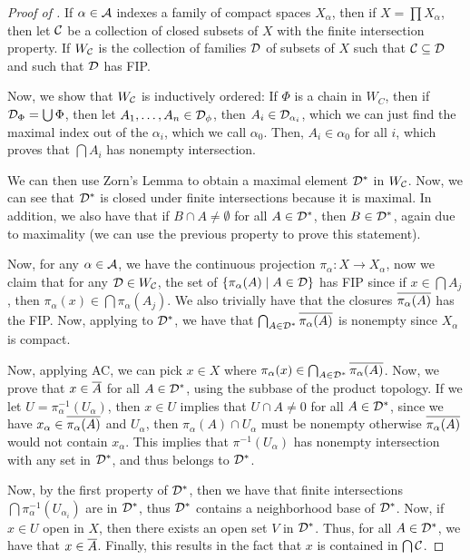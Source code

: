 \begin{proof}[Proof of ]
    If $\alpha \in \mathcal A$ indexes a family of compact spaces $X_\alpha$, then if $X = \prod X_\alpha$, then let $\mathcal C$ be a collection of closed subsets of $X$ with the finite intersection property. If $W_{\mathcal C}$ is the collection of families $\mathcal D$ of subsets of $X$ such that $\mathcal C \subseteq \mathcal D$ and such that $\mathcal D$ has FIP.

    Now, we show that $W_{\mathcal C}$ is inductively ordered: If $\Phi$ is a chain in $W_C$, then if $ \mathcal D_\Phi = \bigcup \Phi$, then let $A_1, \dots, A_n \in \mathcal D_\phi$, then $A_i \in \mathcal D_{\alpha_i}$, which we can just find the maximal index out of the $\alpha_i$, which we call $\alpha_0$. Then, $A_i \in \alpha_0$ for all $i$, which proves that $\bigcap A_i$ has nonempty intersection.

    We can then use Zorn's Lemma to obtain a maximal element $\mathcal D^*$ in $W_{\mathcal C}$. Now, we can see that $\mathcal D^*$ is closed under finite intersections because it is maximal. In addition, we also have that if $B \cap A \ne \emptyset$ for all $A \in \mathcal D^*$, then $B \in \mathcal D^*$, again due to maximality (we can use the previous property to prove this statement).

    Now, for any $\alpha \in \mathcal A$, we have the continuous projection $\pi_\alpha\colon X \to X_\alpha$, now we claim that for any $\mathcal D \in W_{\mathcal C}$, the set of $\qty{\pi_\alpha(A) \mid A \in \mathcal D}$ has FIP since if $x \in \bigcap A_j$, then $\pi_\alpha(x) \in \bigcap \pi_\alpha(A_j)$. We also trivially have that the closures $\overline{\pi_\alpha(A)}$ has the FIP. Now, applying to $\mathcal D^*$, we have that $\bigcap_{A \in \mathcal D^*} \overline{\pi_\alpha(A)}$ is nonempty since $X_\alpha$ is compact.

    Now, applying AC, we can pick $x \in X$ where $\pi_\alpha(x) \in \bigcap_{A \in \mathcal D^*} \overline{\pi_\alpha(A)}$. Now, we prove that $x \in \overline A$ for all $A \in \mathcal D^*$, using the subbase of the product topology. If we let $U = \pi_\alpha^{-1}(U_\alpha)$, then $x \in U$ implies that $U \cap A \ne 0$ for all $A \in \mathcal D^*$, since we have $x_\alpha \in \overline{\pi_\alpha(A)}$ and $U_\alpha$, then $\pi_\alpha(A) \cap U_\alpha$ must be nonempty otherwise $\overline{\pi_\alpha(A)}$ would not contain $x_\alpha$. This implies that $\pi^{-1}(U_\alpha)$ has nonempty intersection with any set in $\mathcal D^*$, and thus belongs to $\mathcal D^*$.

    Now, by the first property of $\mathcal D^*$, then we have that finite intersections $\bigcap \pi_\alpha^{-1}(U_{\alpha_i})$ are in $\mathcal D^*$, thus $\mathcal D^*$ contains a neighborhood base of $\mathcal D^*$. Now, if $x \in U$ open in $X$, then there exists an open set $V$ in $\mathcal D^*$. Thus, for all $A \in \mathcal D^*$, we have that $x \in \overline A$. Finally, this results in the fact that $x$ is contained in $\bigcap \mathcal C$.
\end{proof}

